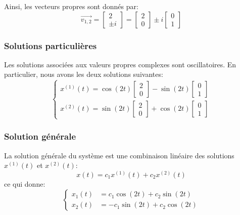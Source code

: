                 Ainsi, les vecteurs propres sont donnés par:
                \begin{equation}
                    \overrightarrow{v_{1,2}}=\begin{bmatrix} 2 \\ \pm i \end{bmatrix}=\begin{bmatrix} 2 \\ 0 \end{bmatrix} \pm i \begin{bmatrix} 0 \\ 1 \end{bmatrix}
                \end{equation}
                
            \subsubsection{Solutions particulières}  
                Les solutions associées aux valeurs propres complexes sont oscillatoires. En particulier, nous avons les deux solutions suivantes:
                \begin{equation}
                    \begin{cases}
                            x^{(1)}(t) = \cos(2t) \begin{bmatrix} 2 \\ 0 \end{bmatrix} - \sin(2t) \begin{bmatrix} 0 \\ 1 \end{bmatrix} \\
                            x^{(2)}(t) = \sin(2t) \begin{bmatrix} 2 \\ 0 \end{bmatrix} + \cos(2t) \begin{bmatrix} 0 \\ 1 \end{bmatrix}
                        \end{cases}
                \end{equation}
            
            \subsubsection{Solution générale}  
                La solution générale du système est une combinaison linéaire des solutions $x^{(1)}(t)$ et $x^{(2)}(t)$:
                \begin{equation}
                    x(t)=c_1 x^{(1)}(t) + c_2 x^{(2)}(t)
                \end{equation}
                ce qui donne:
                \begin{equation}
                    \begin{cases}
                            x_1(t) &= c_1 \cos(2t) + c_2 \sin(2t) \\
                            x_2(t) &= -c_1 \sin(2t) + c_2 \cos(2t)
                    \end{cases}
                \end{equation}
            
